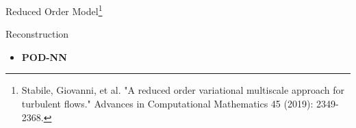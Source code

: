 \documentclass[9pt,compress,t,aspectratio=169]{beamer}
\newcommand{\1}{\begin{pmatrix}
		1\\
		1
\end{pmatrix}}
\newcommand{\highlight}[1]{\textbf{\color{bluemathlab}#1}}
\newcommand{\highlightB}[1]{\textbf{\color{black!15!orangemathlab}#1}}
\begin{document}
\begin{frame}{Reduced Order Model\footnote{Stabile, Giovanni, et al. "A reduced order variational multiscale approach for turbulent flows." Advances in Computational Mathematics 45 (2019): 2349-2368.}}
\begin{minipage}{0.49\textwidth}
{\begin{block}{Reconstruction}
\begin{itemize}
\begin{itemize}
				\item Less nonlinear iterations
				\item For the moment no computational advantage
			\end{itemize}
		\item \highlight{POD-NN}
		\end{itemize}
	\end{block}
}
\end{minipage}
\end{frame}
%
\end{document}
